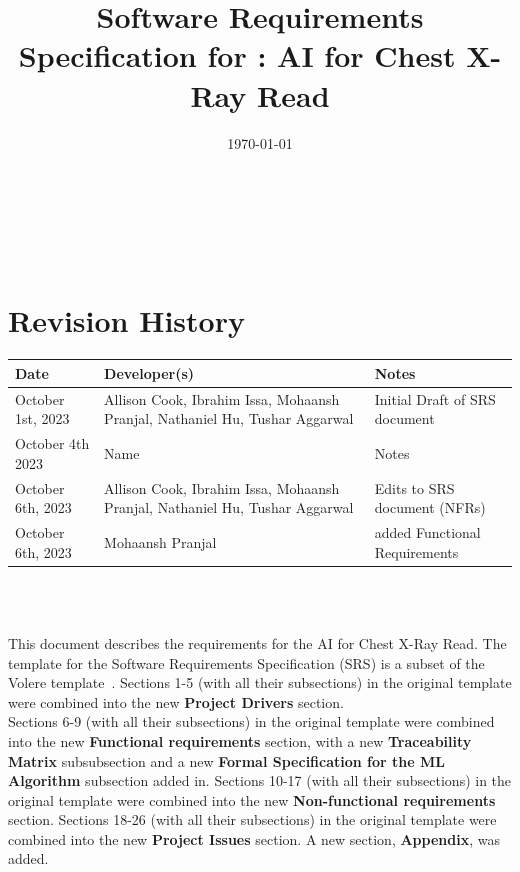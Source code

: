 \documentclass[12pt]{article}
\begin{document}
\title{Software Requirements Specification for \progname: AI for Chest X-Ray Read}
\author{\authname}
\date{\today}
  
\maketitle

~\newpage


\tableofcontents

~\newpage

\section*{Revision History}

\begin{tabularx}{\textwidth}{p{4cm}p{4cm}X}
\toprule {\textbf{Date}} & {\textbf{Developer(s)}} & {\textbf{Notes}}\\
\midrule
October 1st, 2023 & Allison Cook, Ibrahim Issa, Mohaansh Pranjal, Nathaniel Hu,
Tushar Aggarwal & Initial Draft of SRS document \\
October 4th 2023 & Name & Notes\\
October 6th, 2023 & Allison Cook, Ibrahim Issa, Mohaansh Pranjal, Nathaniel Hu,
Tushar Aggarwal  & Edits to SRS document (NFRs) \\
October 6th, 2023 & Mohaansh Pranjal & added Functional Requirements \\

\bottomrule
\end{tabularx}

~\\

~\newpage


\noindent This document describes the requirements for the AI for Chest X-Ray Read. The template for the
Software Requirements Specification (SRS) is a subset of the Volere
template~\citep{RobertsonAndRobertson2012}.
Sections 1-5 (with all their subsections) in the original template were combined into the new \textbf{Project Drivers} section. \\

\noindent Sections 6-9 (with all their subsections) in the original template were combined into the new \textbf{Functional requirements} section, with a new \textbf{Traceability Matrix} subsubsection and a new \textbf{Formal Specification for the ML Algorithm} subsection added in.
Sections 10-17 (with all their subsections) in the original template were combined into the new \textbf{Non-functional requirements} section. Sections 18-26 (with all their subsections) in the original template were combined into the new \textbf{Project Issues} section. A new section, \textbf{Appendix}, was added.
\end{document}
